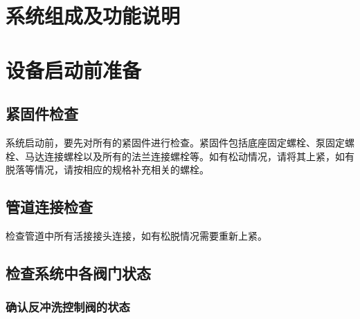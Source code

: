 \documentclass[UTF8,a4paper,12pt,titlepage]{ctexart}
\begin{document}


\tableofcontents %

\newpage %


\section{系统组成及功能说明}\label{sec:sg-1}


\section{设备启动前准备}\label{sec:sg1}
    \subsection{紧固件检查}
    系统启动前，要先对所有的紧固件进行检查。紧固件包括底座固定螺栓、泵固定螺栓、马达连接螺栓以及所有的法兰连接螺栓等。如有松动情况，请将其上紧，如有脱落等情况，请按相应的规格补充相关的螺栓。

    \subsection{管道连接检查}
    检查管道中所有活接接头连接，如有松脱情况需要重新上紧。

    \subsection{检查系统中各阀门状态}
        

        \subsubsection{确认反冲洗控制阀的状态}\label{sec:sg1-1}
        
        
\end{document}
